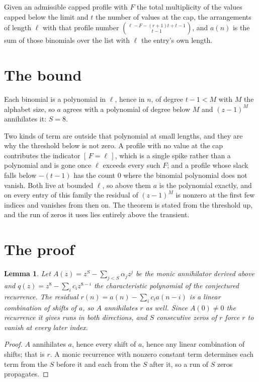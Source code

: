 \documentclass[11pt,a4paper]{article}
\theoremstyle{plain}
\newtheorem{lemma}[theorem]{Lemma}
\theoremstyle{definition}
\begin{document}
Given an admissible capped profile with $F$ the total multiplicity of the values capped below
the limit and $t$ the number of values at the cap, the arrangements of length $\ell$ with that
profile number $\binom{\ell-F-(r+1)t+t-1}{t-1}$, and $a(n)$ is the sum of those binomials
over the list with $\ell$ the entry's own length.

\section{The bound}

Each binomial is a polynomial in $\ell$, hence in $n$, of degree $t-1<M$ with $M$ the alphabet
size, so $a$ agrees with a polynomial of degree below $M$ and $(z-1)^{M}$ annihilates it:
$S=8$.

Two kinds of term are outside that polynomial at small lengths, and they are why the threshold
below is not zero. A profile with no value at the cap contributes the indicator
$[\,F=\ell\,]$, which is a single spike rather than a polynomial and is gone once
$\ell$ exceeds every such $F$; and a profile whose slack falls below $-(t-1)$ has the count
$0$ where the binomial polynomial does not vanish. Both live at bounded $\ell$, so above them
$a$ is the polynomial exactly, and on every entry of this family the residual of $(z-1)^{M}$
is nonzero at the first few indices and vanishes from then on. The theorem is stated from the
threshold up, and the run of zeros it uses lies entirely above the transient.

\section{The proof}

\begin{lemma}\label{lem:crit}
Let $A(z)=z^S-\sum_{j<S}\alpha_jz^{j}$ be the monic annihilator derived above and
$q(z)=z^{8}-\sum_ic_iz^{8-i}$ the characteristic polynomial of the conjectured
recurrence. The residual $r(n)=a(n)-\sum_ic_ia(n-i)$ is a linear combination of shifts of $a$,
so $A$ annihilates $r$ as well. Since $A(0)\ne0$ the recurrence it gives runs in both
directions, and $S$ consecutive zeros of $r$ force $r$ to vanish at every later index.
\end{lemma}

\begin{proof}
$A$ annihilates $a$, hence every shift of $a$, hence any linear combination of shifts; that is
$r$. A monic recurrence with nonzero constant term determines each term from the $S$ before it
and each from the $S$ after it, so a run of $S$ zeros propagates.
\end{proof}
\end{document}
